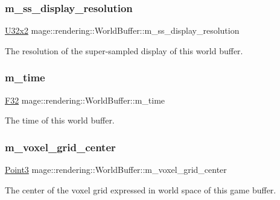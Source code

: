 \subsubsection{\texorpdfstring{m\+\_\+ss\+\_\+display\+\_\+resolution}{m\_ss\_display\_resolution}}
{\footnotesize\ttfamily \hyperlink{namespacemage_a88e05bff0300120c013285d3dcad95c5}{U32x2} mage\+::rendering\+::\+World\+Buffer\+::m\+\_\+ss\+\_\+display\+\_\+resolution}

The resolution of the super-\/sampled display of this world buffer. \hypertarget{structmage_1_1rendering_1_1_world_buffer_a56f828aba079ff56ef931c1f9c903a38}{}\label{structmage_1_1rendering_1_1_world_buffer_a56f828aba079ff56ef931c1f9c903a38} 
\subsubsection{\texorpdfstring{m\+\_\+time}{m\_time}}
{\footnotesize\ttfamily \hyperlink{namespacemage_aa97e833b45f06d60a0a9c4fc22ae02c0}{F32} mage\+::rendering\+::\+World\+Buffer\+::m\+\_\+time}

The time of this world buffer. \hypertarget{structmage_1_1rendering_1_1_world_buffer_af62ba25b808701284c93fe2ccf4541c9}{}\label{structmage_1_1rendering_1_1_world_buffer_af62ba25b808701284c93fe2ccf4541c9} 
\subsubsection{\texorpdfstring{m\+\_\+voxel\+\_\+grid\+\_\+center}{m\_voxel\_grid\_center}}
{\footnotesize\ttfamily \hyperlink{structmage_1_1_point3}{Point3} mage\+::rendering\+::\+World\+Buffer\+::m\+\_\+voxel\+\_\+grid\+\_\+center}

The center of the voxel grid expressed in world space of this game buffer. \hypertarget{structmage_1_1rendering_1_1_world_buffer_a5f4fc26acde41470c46991b9981de12c}{}\label{structmage_1_1rendering_1_1_world_buffer_a5f4fc26acde41470c46991b9981de12c} 
